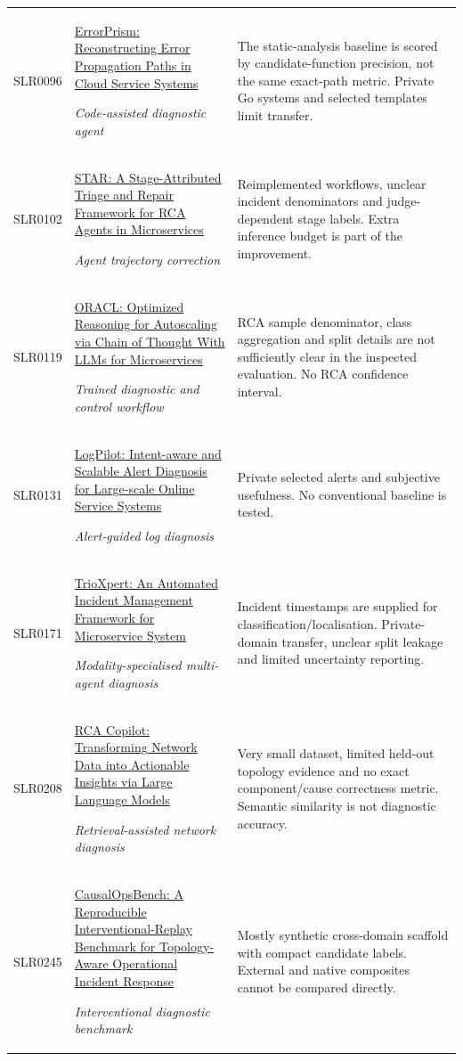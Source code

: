 \begin{longtable}{@{}p{}p{}p{}@{}}
SLR0096 & \href{https://arxiv.org/pdf/2509.26463}{ErrorPrism: Reconstructing Error Propagation Paths in Cloud Service Systems}\par\emph{Code-assisted diagnostic agent} & The static-analysis baseline is scored by candidate-function precision, not the same exact-path metric. Private Go systems and selected templates limit transfer. \\
SLR0102 & \href{https://arxiv.org/pdf/2605.15581}{STAR: A Stage-Attributed Triage and Repair Framework for RCA Agents in Microservices}\par\emph{Agent trajectory correction} & Reimplemented workflows, unclear incident denominators and judge-dependent stage labels. Extra inference budget is part of the improvement. \\
SLR0119 & \href{https://arxiv.org/pdf/2602.05292}{ORACL: Optimized Reasoning for Autoscaling via Chain of Thought With LLMs for Microservices}\par\emph{Trained diagnostic and control workflow} & RCA sample denominator, class aggregation and split details are not sufficiently clear in the inspected evaluation. No RCA confidence interval. \\
SLR0131 & \href{https://arxiv.org/pdf/2509.25874}{LogPilot: Intent-aware and Scalable Alert Diagnosis for Large-scale Online Service Systems}\par\emph{Alert-guided log diagnosis} & Private selected alerts and subjective usefulness. No conventional baseline is tested. \\
SLR0171 & \href{https://arxiv.org/pdf/2506.10043}{TrioXpert: An Automated Incident Management Framework for Microservice System}\par\emph{Modality-specialised multi-agent diagnosis} & Incident timestamps are supplied for classification/localisation. Private-domain transfer, unclear split leakage and limited uncertainty reporting. \\
SLR0208 & \href{https://arxiv.org/pdf/2507.03224}{RCA Copilot: Transforming Network Data into Actionable Insights via Large Language Models}\par\emph{Retrieval-assisted network diagnosis} & Very small dataset, limited held-out topology evidence and no exact component/cause correctness metric. Semantic similarity is not diagnostic accuracy. \\
SLR0245 & \href{https://xplorestaging.ieee.org/ielx8/6287639/11323511/11598804.pdf?arnumber=11598804}{CausalOpsBench: A Reproducible Interventional-Replay Benchmark for Topology-Aware Operational Incident Response}\par\emph{Interventional diagnostic benchmark} & Mostly synthetic cross-domain scaffold with compact candidate labels. External and native composites cannot be compared directly. \\

\end{longtable}
